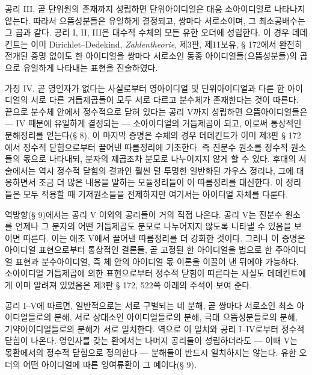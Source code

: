 공리 III, 곧 단위원의 존재까지 성립하면 단위아이디얼은 대응 소아이디얼로 나타나지 않는다. 따라서 으뜸성분들은 유일하게 결정되고, 쌍마다 서로소이며, 그 최소공배수는 그 곱과 같다. 공리 I, II, III은 대수적 수체의 모든 유한 오더에 성립한다. 이 경우 데데킨트는 이미 Dirichlet--Dedekind, \emph{Zahlentheorie}, 제3판, 제11보유, § 172에서 완전히 전개된 증명 없이도 한 아이디얼을 쌍마다 서로소인 동종 아이디얼들(으뜸성분들)의 곱으로 유일하게 나타내는 표현을 진술하였다.

가정 IV, 곧 영인자가 없다는 사실로부터 영아이디얼 및 단위아이디얼과 다른 한 아이디얼의 서로 다른 거듭제곱들이 모두 서로 다르고 분수체가 존재한다는 것이 따른다. 끝으로 분수체 안에서 정수적으로 닫혀 있다는 공리 V까지 성립하면 으뜸아이디얼들은 --- IV 때문에 유일하게 결정되는 --- 소아이디얼의 거듭제곱이 되고, 이로써 통상적인 분해정리를 얻는다(§ 8). 이 마지막 증명은 수체의 경우 데데킨트가 이미 제3판 § 172에서 정수적 닫힘으로부터 끌어낸 따름정리에 기초한다. 즉 진분수 원소를 정수적 원소들의 몫으로 나타내되, 분자의 제곱조차 분모로 나누어지지 않게 할 수 있다. 후대의 서술에서는 역시 정수적 닫힘의 결과인 훨씬 덜 투명한 일반화된 가우스 정리나, 그에 대응하면서 조금 더 많은 내용을 말하는 모듈정리들이 이 따름정리를 대신한다. 이 정리들은 모두 적용할 때 기저원소들을 전제하지만 여기서는 아이디얼 자체를 다룬다.

역방향(§ 9)에서는 공리 V 이외의 공리들이 거의 직접 나온다. 공리 V는 진분수 원소를 언제나 그 분자의 어떤 거듭제곱도 분모로 나누어지지 않도록 나타낼 수 있음을 보이면 따른다. 이는 애초 V에서 끌어낸 따름정리를 더 강화한 것이다. 그러나 이 증명은 아이디얼 표현으로부터 통상적인 결론들, 곧 고정된 한 아이디얼을 법으로 한 주아이디얼 표현과 분수아이디얼, 즉 체 안의 아이디얼 몫 이론을 이끌어 낸 뒤에야 가능하다. 소아이디얼 거듭제곱에 의한 표현으로부터 정수적 닫힘이 따른다는 사실도 데데킨트에게 이미 알려져 있었음은 제3판 § 172, 522쪽 아래의 주석이 보여 준다.

공리 I--V에 따르면, 일반적으로는 서로 구별되는 네 분해, 곧 쌍마다 서로소인 최소 아이디얼들로의 분해, 서로 상대소인 아이디얼들로의 분해, 극대 으뜸성분들로의 분해, 기약아이디얼들로의 분해가 서로 일치한다. 역으로 이 일치와 공리 I--IV로부터 정수적 닫힘이 나온다. 영인자를 갖는 환에서는 나머지 공리들이 성립하더라도 --- 이때 V는 몫환에서의 정수적 닫힘으로 정의한다 --- 분해들이 반드시 일치하지는 않는다. 유한 오더의 어떤 아이디얼에 따른 잉여류환이 그 예이다(§ 9).


